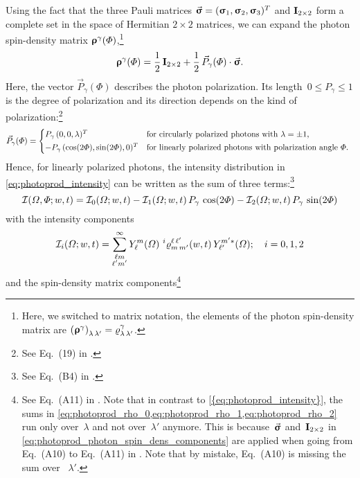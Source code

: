 Using the fact that the three Pauli matrices $\vec{\bm{\mathrm{\upsigma}}} =
(\bm{\mathrm{\upsigma}}_1, \bm{\mathrm{\upsigma}}_2, \bm{\mathrm{\upsigma}}_3)^T$ and
$\bm{\mathrm{I}}_{2 \times 2}$ form a complete set in the space of Hermitian
$2 \times 2$ matrices, we can expand the photon spin-density matrix
$\bm{\mathrm{\upvarrho}}^\gamma(\Phi)$,\footnote{Here, we switched to matrix
notation, \ie the elements of the photon spin-density matrix are
$\rBrk{\mat{\upvarrho}^\gamma}_{\lambda\, \lambda'} =
\varrho^\gamma_{\lambda\, \lambda'}$.}
\ie
\begin{equation}
  \label{eq:photoprod_photon_spin_dens_components}
  \bm{\mathrm{\upvarrho}}^\gamma(\Phi)
  = \frac{1}{2}\, \bm{\mathrm{I}}_{2 \times 2} + \frac{1}{2}\, \vec{P}_\gamma(\Phi) \cdot \vec{\bm{\mathrm{\upsigma}}}.
\end{equation}
Here, the vector $\vec{P}_\gamma(\Phi)$ describes the photon
polarization.  Its length~$0 \leq P_\gamma \leq 1$ is the degree of
polarization and its direction depends on the kind of
polarization:\footnote{See Eq.~(19) in .}
\begin{equation}
  \vec{P}_\gamma(\Phi)
  = \begin{cases*}
    P_\gamma\, (0, 0, \lambda)^T                & for circularly polarized photons with $\lambda = \pm 1$, \\
    -P_\gamma\, (\cos(2 \Phi), \sin(2 \Phi), 0)^T & for linearly polarized photons with polarization angle~$\Phi$.
  \end{cases*}
\end{equation}
Hence, for linearly polarized photons, the intensity distribution in
\cref{eq:photoprod_intensity} can be written as the sum of three
terms:\footnote{See Eq.~(B4) in .}
\begin{equation}
  \label{eq:photoprod_intensity_sum}
  \mathcal{I}(\Omega, \Phi; w, t)
  = \mathcal{I}_0(\Omega; w, t)
  - \mathcal{I}_1(\Omega; w, t)\, P_\gamma\, \cos(2 \Phi)
  - \mathcal{I}_2(\Omega; w, t)\, P_\gamma\, \sin(2 \Phi)
\end{equation}
with the intensity components
\begin{equation}
  \label{eq:photoprod_intensity_components}
  \mathcal{I}_i(\Omega; w, t)
  = \sum_{\substack{\ell m \\ \ell' m'}}^\infty
  Y_\ell^m(\Omega)\,
  \prescript{i}{}{\varrho}^{\ell\, \ell'}_{m\, m'}(w, t)\,
  Y_{\ell'}^{m' *}(\Omega);
  \quad i = 0, 1, 2
\end{equation}
and the spin-density matrix components\footnote{See Eq.~(A11) in
.  Note that in contrast to
\cref{{eq:photoprod_intensity}}, the sums in
\cref{eq:photoprod_rho_0,eq:photoprod_rho_1,eq:photoprod_rho_2} run
only over~$\lambda$ and not over~$\lambda'$ anymore.  This is
because~$\vec{\bm{\mathrm{\upsigma}}}$ and~$\bm{\mathrm{I}}_{2 \times 2}$ in
\cref{eq:photoprod_photon_spin_dens_components} are applied when going
from Eq.~(A10) to Eq.~(A11) in .  Note that
by mistake, Eq.~(A10) is missing the sum over ~$\lambda'$.}

